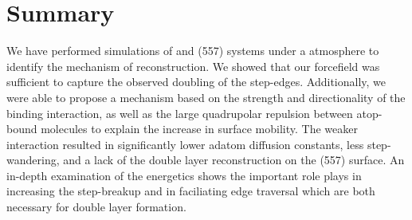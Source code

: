\section{Summary}
We have performed simulations of  and  (557) systems under a
 atmosphere to identify the mechanism of reconstruction. We showed that
our  forcefield was sufficient to capture the observed
doubling of the  step-edges. Additionally, we were able to propose a
mechanism based on the strength and directionality of the 
binding interaction, as well as the large quadrupolar repulsion between
atop-bound  molecules to explain the increase in surface mobility. The
weaker  interaction resulted in significantly lower adatom
diffusion constants, less step-wandering, and a lack of the double layer
reconstruction on the  (557) surface. An in-depth examination of the
energetics shows the important role  plays in increasing the
step-breakup and in faciliating edge traversal which are both necessary for
double layer formation.


%






